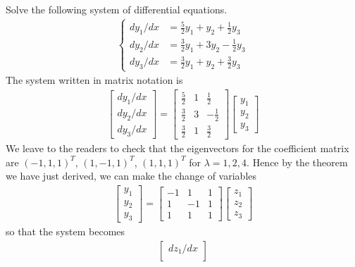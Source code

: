 \begin{exmp}
Solve the following system of differential equations.
\begin{align*}
\begin{cases}
dy_1/dx &= \frac{5}{2} y_1 + y_2 + \frac{1}{2} y_3 \\
dy_2/dx &= \frac{3}{2} y_1 + 3 y_2 - \frac{1}{2} y_3 \\
dy_3/dx &= \frac{3}{2} y_1 + y_2 + \frac{3}{2} y_3 
\end{cases}    
\end{align*}
The system written in matrix notation is
\begin{align*}
\begin{bmatrix}
dy_1/dx \\
dy_2/dx \\
dy_3/dx
\end{bmatrix}
=
\begin{bmatrix}
\frac{5}{2} & 1 & \frac{1}{2} \\
\frac{3}{2} & 3 & -\frac{1}{2} \\
\frac{3}{2} & 1 & \frac{3}{2}
\end{bmatrix}
\begin{bmatrix}
y_1 \\
y_2 \\
y_3
\end{bmatrix}
\end{align*}
We leave to the readers to check that the eigenvectors for the coefficient matrix are $(-1,1,1)^T$, $(1,-1,1)^T$, $(1,1,1)^T$ for $\lambda = 1, 2, 4$. Hence by the theorem we have just derived, we can make the change of variables
\begin{align*}
\begin{bmatrix}
y_1 \\
y_2 \\
y_3
\end{bmatrix}
=
\begin{bmatrix}
-1 & 1 & 1 \\
1 & -1 & 1 \\
1 & 1 & 1
\end{bmatrix}
\begin{bmatrix}
z_1 \\
z_2 \\
z_3
\end{bmatrix}
\end{align*}
so that the system becomes
\begin{align*}
\begin{bmatrix}
dz_1/dx \\

\end{bmatrix}
\end{align*}
\end{exmp}
